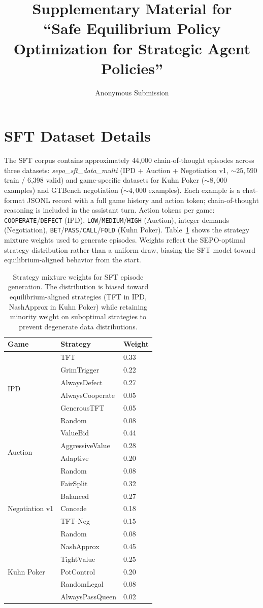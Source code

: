 \documentclass[letterpaper]{article} %
\title{Supplementary Material for\\ ``Safe Equilibrium Policy Optimization for Strategic Agent Policies''}
\author{Anonymous Submission}
\begin{document}
\maketitle
\appendix
\section{SFT Dataset Details}
\label{app:data}
The SFT corpus contains approximately 44,000 chain-of-thought episodes across three datasets: \textit{sepo\_sft\_data\_multi} (IPD + Auction + Negotiation v1, ${\sim}25{,}590$ train / 6,398 valid) and game-specific datasets for Kuhn Poker (${\sim}8{,}000$ examples) and GTBench negotiation (${\sim}4{,}000$ examples). Each example is a chat-format JSONL record with a full game history and action token; chain-of-thought reasoning is included in the assistant turn. Action tokens per game: \texttt{COOPERATE}/\texttt{DEFECT} (IPD), \texttt{LOW}/\texttt{MEDIUM}/\texttt{HIGH} (Auction), integer demands (Negotiation), \texttt{BET}/\texttt{PASS}/\texttt{CALL}/\texttt{FOLD} (Kuhn Poker).
Table~\ref{tab:sft_weights} shows the strategy mixture weights used to generate episodes. Weights reflect the SEPO-optimal strategy distribution rather than a uniform draw, biasing the SFT model toward equilibrium-aligned behavior from the start.
\begin{table}[h]
\centering
\small
\begin{tabular}{@{}lll@{}}
\toprule
\textbf{Game} & \textbf{Strategy} & \textbf{Weight} \\
\midrule
\multirow{6}{*}{IPD} & TFT & 0.33 \\
 & GrimTrigger & 0.22 \\
 & AlwaysDefect & 0.27 \\
 & AlwaysCooperate & 0.05 \\
 & GenerousTFT & 0.05 \\
 & Random & 0.08 \\
\midrule
\multirow{4}{*}{Auction} & ValueBid & 0.44 \\
 & AggressiveValue & 0.28 \\
 & Adaptive & 0.20 \\
 & Random & 0.08 \\
\midrule
\multirow{5}{*}{Negotiation v1} & FairSplit & 0.32 \\
 & Balanced & 0.27 \\
 & Concede & 0.18 \\
 & TFT-Neg & 0.15 \\
 & Random & 0.08 \\
\midrule
\multirow{5}{*}{Kuhn Poker} & NashApprox & 0.45 \\
 & TightValue & 0.25 \\
 & PotControl & 0.20 \\
 & RandomLegal & 0.08 \\
 & AlwaysPassQueen & 0.02 \\
\bottomrule
\end{tabular}
\caption{Strategy mixture weights for SFT episode generation. The distribution is biased toward equilibrium-aligned strategies (TFT in IPD, NashApprox in Kuhn Poker) while retaining minority weight on suboptimal strategies to prevent degenerate data distributions.}
\label{tab:sft_weights}
\end{table}
\end{document}
